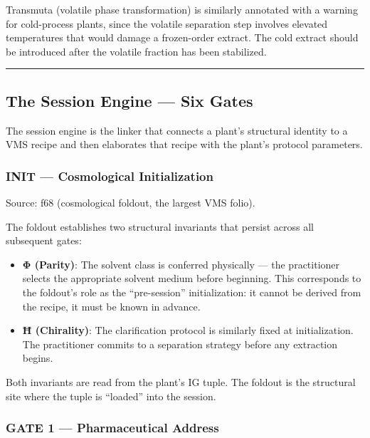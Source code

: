 \documentclass[12pt,a4paper]{article}
\begin{document}
Transmuta (volatile phase transformation) is similarly annotated with a
warning for cold-process plants, since the volatile separation step
involves elevated temperatures that would damage a frozen-order extract.
The cold extract should be introduced after the volatile fraction has
been stabilized.

\begin{center}\rule{0.5\linewidth}{0.5pt}\end{center}

\hypertarget{the-session-engine-six-gates}{%
\subsection{The Session Engine --- Six
Gates}\label{the-session-engine-six-gates}}

The session engine is the linker that connects a plant's structural
identity to a VMS recipe and then elaborates that recipe with the
plant's protocol parameters.

\hypertarget{init-cosmological-initialization}{%
\subsubsection{INIT --- Cosmological
Initialization}\label{init-cosmological-initialization}}

Source: f68 (cosmological foldout, the largest VMS folio).

The foldout establishes two structural invariants that persist across
all subsequent gates:

\begin{itemize}
\item
  \textbf{Φ (Parity)}: The solvent class is conferred physically --- the
  practitioner selects the appropriate solvent medium before beginning.
  This corresponds to the foldout's role as the ``pre-session''
  initialization: it cannot be derived from the recipe, it must be known
  in advance.
\item
  \textbf{Ħ (Chirality)}: The clarification protocol is similarly fixed
  at initialization. The practitioner commits to a separation strategy
  before any extraction begins.
\end{itemize}

Both invariants are read from the plant's IG tuple. The foldout is the
structural site where the tuple is ``loaded'' into the session.

\hypertarget{gate-1-pharmaceutical-address}{%
\subsubsection{GATE 1 --- Pharmaceutical
Address}\label{gate-1-pharmaceutical-address}}
\end{document}
